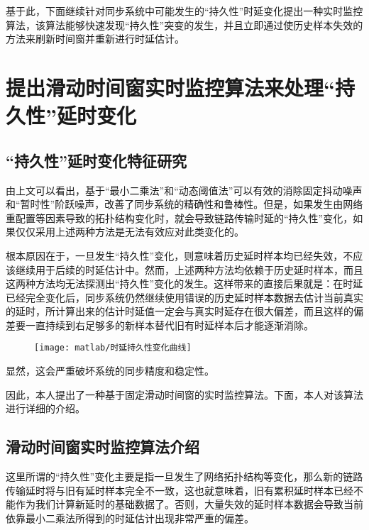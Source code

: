基于此，下面继续针对同步系统中可能发生的“持久性”时延变化提出一种实时监控算法，该算法能够快速发现“持久性”突变的发生，并且立即通过使历史样本失效的方法来刷新时间窗并重新进行时延估计。

\section{提出滑动时间窗实时监控算法来处理“持久性”延时变化}
\subsection{“持久性”延时变化特征研究}
由上文可以看出，基于“最小二乘法”和“动态阈值法”可以有效的消除固定抖动噪声和“暂时性”阶跃噪声，改善了同步系统的精确性和鲁棒性。但是，如果发生由网络重配置等因素导致的拓扑结构变化时，就会导致链路传输时延的“持久性”变化，如果仅仅采用上述两种方法是无法有效应对此类变化的。

根本原因在于，一旦发生“持久性”变化，则意味着历史延时样本均已经失效，不应该继续用于后续的时延估计中。然而，上述两种方法均依赖于历史延时样本，而且这两种方法均无法探测出“持久性”变化的发生。这样带来的直接后果就是：在时延已经完全变化后，同步系统仍然继续使用错误的历史延时样本数据去估计当前真实的延时，所计算出来的估计时延值一定会与真实时延存在很大偏差，而且这样的偏差要一直持续到右足够多的新样本替代旧有时延样本后才能逐渐消除。

\begin{figure}[!hbp]
  \centering
  \begin{minipage}[b]{0.6\textwidth}
    \captionstyle{\centering}
    \centering
    \texttt{[image: matlab/时延持久性变化曲线]}
  \end{minipage}     
\end{figure}

显然，这会严重破坏系统的同步精度和稳定性。

因此，本人提出了一种基于固定滑动时间窗的实时监控算法。下面，本人对该算法进行详细的介绍。

\subsection{滑动时间窗实时监控算法介绍}
这里所谓的“持久性”变化主要是指一旦发生了网络拓扑结构等变化，那么新的链路传输延时将与旧有延时样本完全不一致，这也就意味着，旧有累积延时样本已经不能作为我们计算新延时的基础数据了。否则，大量失效的延时样本数据会导致当前依靠最小二乘法所得到的时延估计出现非常严重的偏差。

